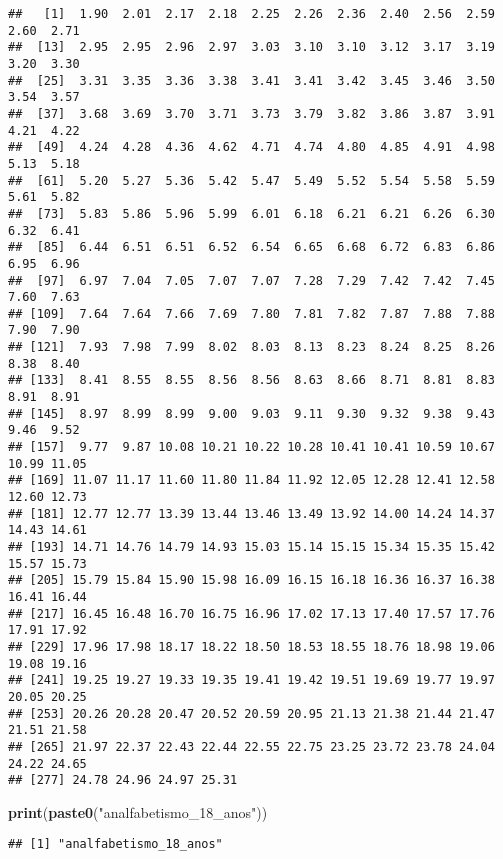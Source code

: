 \documentclass[
]{article}
\newenvironment{Shaded}{\begin{snugshade}}{\end{snugshade}}
\newcommand{\FunctionTok}[1]{\textcolor[rgb]{0.13,0.29,0.53}{\textbf{#1}}}
\newcommand{\NormalTok}[1]{#1}
\newcommand{\StringTok}[1]{\textcolor[rgb]{0.31,0.60,0.02}{#1}}
\begin{document}
\begin{verbatim}
##   [1]  1.90  2.01  2.17  2.18  2.25  2.26  2.36  2.40  2.56  2.59  2.60  2.71
##  [13]  2.95  2.95  2.96  2.97  3.03  3.10  3.10  3.12  3.17  3.19  3.20  3.30
##  [25]  3.31  3.35  3.36  3.38  3.41  3.41  3.42  3.45  3.46  3.50  3.54  3.57
##  [37]  3.68  3.69  3.70  3.71  3.73  3.79  3.82  3.86  3.87  3.91  4.21  4.22
##  [49]  4.24  4.28  4.36  4.62  4.71  4.74  4.80  4.85  4.91  4.98  5.13  5.18
##  [61]  5.20  5.27  5.36  5.42  5.47  5.49  5.52  5.54  5.58  5.59  5.61  5.82
##  [73]  5.83  5.86  5.96  5.99  6.01  6.18  6.21  6.21  6.26  6.30  6.32  6.41
##  [85]  6.44  6.51  6.51  6.52  6.54  6.65  6.68  6.72  6.83  6.86  6.95  6.96
##  [97]  6.97  7.04  7.05  7.07  7.07  7.28  7.29  7.42  7.42  7.45  7.60  7.63
## [109]  7.64  7.64  7.66  7.69  7.80  7.81  7.82  7.87  7.88  7.88  7.90  7.90
## [121]  7.93  7.98  7.99  8.02  8.03  8.13  8.23  8.24  8.25  8.26  8.38  8.40
## [133]  8.41  8.55  8.55  8.56  8.56  8.63  8.66  8.71  8.81  8.83  8.91  8.91
## [145]  8.97  8.99  8.99  9.00  9.03  9.11  9.30  9.32  9.38  9.43  9.46  9.52
## [157]  9.77  9.87 10.08 10.21 10.22 10.28 10.41 10.41 10.59 10.67 10.99 11.05
## [169] 11.07 11.17 11.60 11.80 11.84 11.92 12.05 12.28 12.41 12.58 12.60 12.73
## [181] 12.77 12.77 13.39 13.44 13.46 13.49 13.92 14.00 14.24 14.37 14.43 14.61
## [193] 14.71 14.76 14.79 14.93 15.03 15.14 15.15 15.34 15.35 15.42 15.57 15.73
## [205] 15.79 15.84 15.90 15.98 16.09 16.15 16.18 16.36 16.37 16.38 16.41 16.44
## [217] 16.45 16.48 16.70 16.75 16.96 17.02 17.13 17.40 17.57 17.76 17.91 17.92
## [229] 17.96 17.98 18.17 18.22 18.50 18.53 18.55 18.76 18.98 19.06 19.08 19.16
## [241] 19.25 19.27 19.33 19.35 19.41 19.42 19.51 19.69 19.77 19.97 20.05 20.25
## [253] 20.26 20.28 20.47 20.52 20.59 20.95 21.13 21.38 21.44 21.47 21.51 21.58
## [265] 21.97 22.37 22.43 22.44 22.55 22.75 23.25 23.72 23.78 24.04 24.22 24.65
## [277] 24.78 24.96 24.97 25.31
\end{verbatim}

\begin{Shaded}
\begin{Highlighting}[]
\FunctionTok{print}\NormalTok{(}\FunctionTok{paste0}\NormalTok{(}\StringTok{"analfabetismo\_18\_anos"}\NormalTok{))}
\end{Highlighting}
\end{Shaded}

\begin{verbatim}
## [1] "analfabetismo_18_anos"
\end{verbatim}
\end{document}
